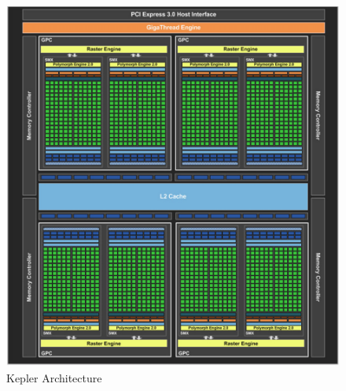 \documentclass{article}
\begin{document}
 \begin{figure}[H]
 \centering
\includegraphics[scale=0.5]{KeplerArch}
\caption{Kepler Architecture}
 \end{figure}
\end{document}
